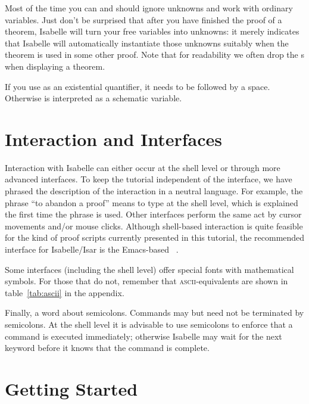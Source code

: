 Most of the time you can and should ignore unknowns and work with ordinary
variables. Just don't be surprised that after you have finished the proof of
a theorem, Isabelle will turn your free variables into unknowns: it merely
indicates that Isabelle will automatically instantiate those unknowns
suitably when the theorem is used in some other proof.
Note that for readability we often drop the s when displaying a theorem.
\begin{warn}
  If you use  as an existential
  quantifier, it needs to be followed by a space. Otherwise  is
  interpreted as a schematic variable.
\end{warn}

\section{Interaction and Interfaces}

Interaction with Isabelle can either occur at the shell level or through more
advanced interfaces. To keep the tutorial independent of the interface, we
have phrased the description of the interaction in a neutral language. For
example, the phrase ``to abandon a proof'' means to type  at the
shell level, which is explained the first time the phrase is used. Other
interfaces perform the same act by cursor movements and/or mouse clicks.
Although shell-based interaction is quite feasible for the kind of proof
scripts currently presented in this tutorial, the recommended interface for
Isabelle/Isar is the Emacs-based ~\cite{Aspinall:TACAS:2000,proofgeneral}.

Some interfaces (including the shell level) offer special fonts with
mathematical symbols. For those that do not, remember that \textsc{ascii}-equivalents
are shown in table~\ref{tab:ascii} in the appendix.

Finally, a word about semicolons. 
Commands may but need not be terminated by semicolons.
At the shell level it is advisable to use semicolons to enforce that a command
is executed immediately; otherwise Isabelle may wait for the next keyword
before it knows that the command is complete.


\section{Getting Started}

